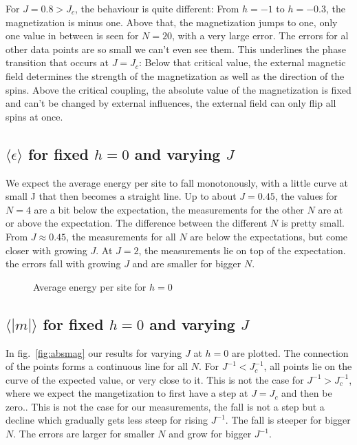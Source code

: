 \documentclass{scrartcl}
\begin{document}
For $J=0.8>J_c$, the behaviour is quite different: From $h=-1$ to $h=-0.3$, the magnetization is minus one. Above that, the magnetization jumps to one, only one value in between is seen for $N=20$, with a very large error. The errors for al other data points are so small we can't even see them. This underlines the phase transition that occurs at $J=J_c$: Below that critical value, the external magnetic field determines the strength of the magnetization as well as the direction of the spins. Above the critical coupling, the absolute value of the magnetization is fixed and can't be changed by external influences, the external field can only flip all spins at once.


\subsection{$\langle \epsilon\rangle$ for fixed $h=0$ and varying $J$}
We expect the average energy per site to fall monotonously, with a little curve at small J that then becomes a straight line. Up to about $J=0.45$, the values for $N=4$ are a bit below the expectation, the measurements for the other $N$ are at or above the expectation. The difference between the different $N$ is pretty small. From $J\approx0.45$, the measurements for all $N$ are below the expectations, but come closer with growing $J$. At $J=2$, the measurements lie on top of the expectation. the errors fall with growing $J$ and are smaller for bigger $N$.

	\begin{figure}[htbp]
		
		\caption{Average energy per site for $h=0$}
		\label{fig:energy}
	\end{figure}

\subsection{$\langle |m|\rangle$ for fixed $h=0$ and varying $J$}
In fig.~\ref{fig:absmag} our results for varying $J$ at $h=0$ are plotted. The connection of the points forms a continuous line for all $N$. For $J^{-1}<J_c^{-1}$, all points lie on the curve of the expected value, or very close to it. This is not the case for $J^{-1}>J_c^{-1}$, where we expect the mangetization to first have a step at $J=J_c$ and then be zero.. This is not the case for our measurements, the fall is not a step but a decline which gradually gets less steep for rising $J^{-1}$. The fall is steeper for bigger $N$. The errors are larger for smaller $N$ and grow for bigger $J^{-1}$.
\end{document}
